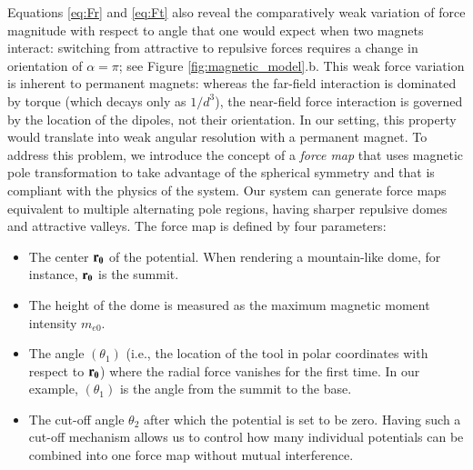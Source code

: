 Equations \ref{eq:Fr} and \ref{eq:Ft} also reveal the comparatively weak variation of force magnitude with respect to angle that one would expect when two magnets interact: switching from attractive to repulsive forces requires a change in orientation of $\alpha = \pi$; see Figure \ref{fig:magnetic_model}.b. This weak force variation is inherent to permanent magnets: whereas the far-field interaction is dominated by torque (which decays only as $1/d^3$), the near-field force interaction is governed by the location of the dipoles, not their orientation. In our setting, this property would translate into weak angular resolution with a permanent magnet. To address this problem, we introduce the concept of a \emph{force map} that uses magnetic pole transformation to take advantage of the spherical symmetry and that is compliant with the physics of the system. Our system can generate force maps equivalent to multiple alternating pole regions, having sharper repulsive domes and attractive valleys. The force map is defined by four parameters:
\begin{itemize}
\item The center $\mathbf{r_{0}}$ of the potential. When rendering a mountain-like dome, for instance, $\mathbf{r_{0}}$ is the summit.
\item The height of the dome is measured as the maximum magnetic moment intensity $m_{e0}$.
\item The angle $(\theta_1)$ (i.e., the location of the tool in polar coordinates with respect to $\mathbf{r_{0}}$) where the radial force vanishes for the first time. In our example, $(\theta_1)$ is the angle from the summit to the base. %
\item The cut-off angle $\theta_2$ after which the potential is set to be zero. Having such a cut-off mechanism allows us to control how many individual potentials can be combined into one force map without mutual interference.
\end{itemize}


